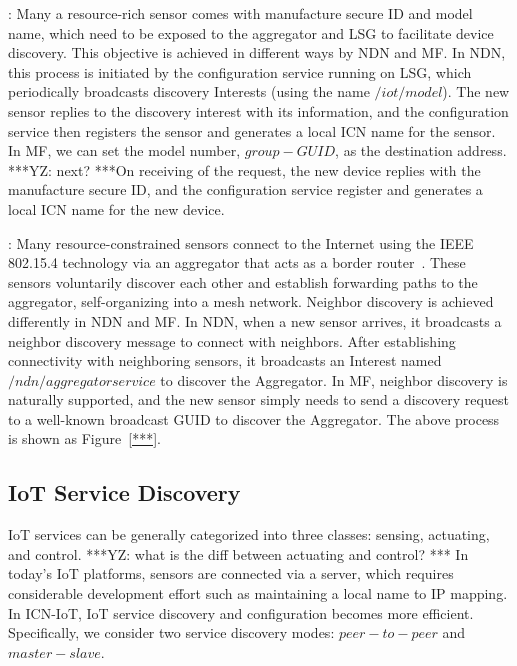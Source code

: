 \vspace{1mm}: Many a resource-rich sensor comes with manufacture secure ID and model name, which need to be exposed to the aggregator and LSG to facilitate device discovery. This objective is achieved in different ways by NDN and MF.  In NDN, this process is initiated by the configuration service running on LSG, which periodically broadcasts discovery Interests (using the name $/iot/model$). The new sensor replies to the discovery interest with its information, and the configuration service then registers the sensor and generates a local ICN name for the sensor. In MF, we can set the model number, $group-GUID$, as the destination address. ***YZ: next? ***On receiving of the request, the new device replies with the manufacture secure ID, and the configuration service register and generates a local ICN name for the new device.


\vspace{1mm}: Many resource-constrained sensors connect to the Internet using the IEEE 802.15.4 technology via an aggregator that acts as a border router~\cite{*cite Zigbee ipj*}. These sensors voluntarily discover each other and establish forwarding paths to the aggregator, self-organizing into a mesh network. Neighbor discovery is achieved differently in NDN and MF. In NDN, when a new sensor arrives, it broadcasts a neighbor discovery message to connect with neighbors. After establishing connectivity with neighboring sensors, it broadcasts an Interest named $/ndn/aggregatorservice$ to discover the Aggregator. In MF, neighbor discovery is naturally supported, and the new sensor simply needs to send a discovery request to a well-known broadcast GUID to discover the Aggregator. %
The above process is shown as Figure~\ref{***}.




\subsection{IoT Service Discovery}

IoT services can be generally categorized into three classes: sensing, actuating, and control. ***YZ: what is the diff between actuating and control? *** In today's IoT platforms, sensors are connected via a server, which requires considerable development effort such as maintaining a local name to IP mapping. In ICN-IoT, IoT service discovery and configuration becomes more efficient. Specifically, we consider two service discovery modes: $peer-to-peer$ and $master-slave$.


